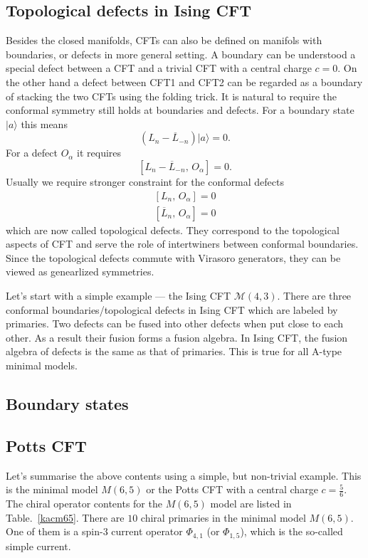 \subsection{Topological defects in Ising CFT}
Besides the closed manifolds, CFTs can also be defined on manifols with boundaries, or defects in more general setting. A boundary can be understood a special defect between a CFT and a trivial CFT with a central charge $c=0$. On the other hand a defect between CFT1 and CFT2 can be regarded as a boundary of stacking the two CFTs using the folding trick. It is natural to require the conformal symmetry still holds at boundaries and defects. For a boundary state $\vert a \rangle$ this means 
\begin{equation}
	\left ( L_n - \overline{L}_{-n} \right ) \vert a \rangle = 0.
\end{equation}
For a defect $O_\alpha$ it requires
\begin{equation}
	\left[ L_n - \overline{L}_{-n},\, O_\alpha \right] = 0.
\end{equation}
Usually we require stronger constraint for the conformal defects 
\begin{equation}
	\begin{aligned}
		\left[ L_n,\, O_\alpha \right] = 0 \\
		\left[ \overline{L}_{n},\, O_\alpha \right] = 0
	\end{aligned}
\end{equation}
which are now called topological defects. They correspond to the topological aspects of CFT and serve the role of intertwiners between conformal boundaries. Since the topological defects commute with Virasoro generators, they can be viewed as genearlized symmetries. 

Let's start with a simple example --- the Ising CFT $\mathcal{M}(4,3)$. There are three conformal boundaries/topological defects in Ising CFT which are labeled by primaries. Two defects can be fused into other defects when put close to each other. As a result their fusion forms a fusion algebra. In Ising CFT, the fusion algebra of defects is the same as that of primaries. This is true for all A-type minimal models. 

\subsection{Boundary states}

\subsection{Potts CFT}
Let's summarise the above contents using a simple, but non-trivial example. This is the minimal model $M(6,5)$ or the Potts CFT with a central charge $c=\frac{5}{6}$. The chiral operator contents for the $M(6,5)$ model are listed in Table.~\ref{kacm65}. There are $10$ chiral primaries in the minimal model $M(6,5)$. One of them is a spin-$3$ current operator $\Phi_{4,1}$ (or $\Phi_{1,5}$), which is the so-called simple current. 

